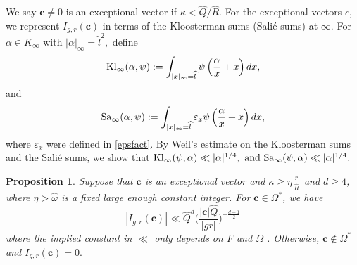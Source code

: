 \documentclass[11pt]{amsart}
\theoremstyle{plain}
\theoremstyle{plain}
\newtheorem{proposition}[theorem]{Proposition}
\renewcommand{\vec}[1]{\mathbf{#1}}
\theoremstyle{remark}
\theoremstyle{definition}
\renewcommand{\hat}{\widehat}
\newcommand{\hQ}{\widehat{Q}}
\newcommand{\hR}{\widehat{R}}
\newcommand{\hl}{\widehat l}
\newcommand{\Kl}{\textup{Kl}}
\newcommand{\Sa}{\textup{Sa}}
\begin{document}
We say $\vec{c}\neq 0$ is an exceptional vector if  $\kappa<  \hQ/\hR.$ For the exceptional vectors $c$, we  represent $I_{g,r}(\vec{c})$  in terms of the Kloosterman sums (Sali\'e sums) at $\infty.$  For $\alpha \in K_{\infty}$ with $|\alpha|_{\infty}={\hl}^2,$ define 
\[
\Kl_{\infty}(\alpha,\psi):=\int_{|x|_{\infty}=\hl} \psi\left(\frac{\alpha}{ x}+x\right) dx,
\]
and 
\[
\Sa_{\infty}(\alpha,\psi):=\int_{|x|_{\infty}=\hl} \varepsilon_{x} \psi\left(\frac{\alpha}{ x}+x\right) dx,
\]
where $\varepsilon_x$ were defined in \eqref{epsfact}.  By Weil's estimate on the Kloosterman sums and  the Sali\'e sums, we show that   
 \(
 \Kl_{\infty}(\psi,\alpha) \ll |\alpha|^{1/4}, \text { and } \Sa_{\infty}(\psi,\alpha)  \ll |\alpha|^{1/4}.
 \)  

\begin{proposition}\label{c}
Suppose that $\vec{c}$ is an exceptional vector and $\kappa\geq  \eta \frac{|r|}{\hR}$ and $d\geq 4$, where   $\eta> \hat{\omega}$ is a fixed large enough constant integer.  For $\vec{c}\in \Omega^*$, we have  
 \begin{equation}
\label{excep}
|I_{g,r}(\vec{c})|\ll  \hQ^d\Big(\frac{|\vec{c}|\hQ}{|gr|}   \Big)^{-\frac{d-1}{2}}
\end{equation}
where the implied constant in $\ll$ only depends on  $F$ and $\Omega$ . Otherwise, $\vec{c}\notin \Omega^*$  and $I_{g,r}(\vec{c})=0.$
\end{proposition}
\end{document}
